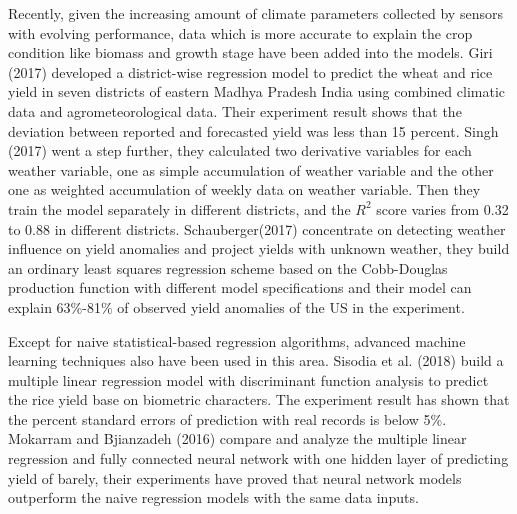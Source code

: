 \documentclass[conference, a4paper]{IEEEtran}
\begin{document}
  Recently, given the increasing amount of climate parameters collected by sensors with evolving performance, data which is more accurate to explain the crop condition like biomass and growth stage have been added into the models. Giri (2017) \cite{giriDistrictwiseWheatRice2017} developed a district-wise regression model to predict the wheat and rice yield in seven districts of eastern Madhya Pradesh India using combined climatic data and agrometeorological data. Their experiment result shows that the deviation between reported and forecasted yield was less than 15 percent. Singh (2017) \cite{singhForecastingMaizeYield2017} went a step further, they calculated two derivative variables for each weather variable, one as simple accumulation of weather variable and the other one as weighted accumulation of weekly data on weather variable. Then they train the model separately in different districts, and the $R^2$ score varies from 0.32 to 0.88 in different districts. Schauberger(2017)\cite{schaubergerGlobalEvaluationSemiempirical2017} concentrate on detecting weather influence on yield anomalies and project yields with unknown weather, they build an ordinary least squares regression scheme based on the Cobb-Douglas production function with different model specifications and their model can explain 63\%-81\% of observed yield anomalies of the US in the experiment.

  Except for naive statistical-based regression algorithms, advanced machine learning techniques also have been used in this area. Sisodia et al. (2018) \cite{sisodiaPreharvestForecastModel2018} build a multiple linear regression model with discriminant function analysis to predict the rice yield base on biometric characters. The experiment result has shown that the percent standard errors of prediction with real records is below 5\%. Mokarram and Bjianzadeh (2016) \cite{mokarramPredictionBiologicalGrain2016} compare and analyze the multiple linear regression and fully connected neural network with one hidden layer of predicting yield of barely, their experiments have proved that neural network models outperform the naive regression models with the same data inputs. 
\end{document}
